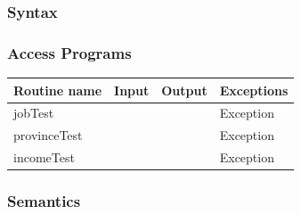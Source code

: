 \documentclass[12pt,fleqn]{article}
\begin{document}
\subsubsection* {Syntax}

\subsubsection* {Access Programs}
\begin{tabular}{| l | l | l | l |}
\hline
\textbf{Routine name} & \textbf{Input} & \textbf{Output} & \textbf{Exceptions}\\
\hline
jobTest & ~ & ~ & Exception\\
\hline
provinceTest & ~ & ~ & Exception\\
\hline
incomeTest & ~ & ~ & Exception\\
\hline
\end{tabular}

\subsubsection*{Semantics}
\end{document}
